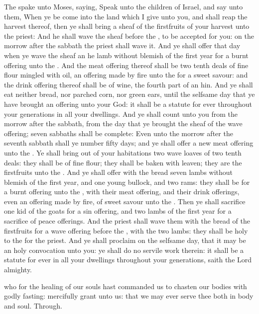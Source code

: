  The  spake unto Moses, saying, Speak unto the children of Israel, and say unto them, When ye be come into the land which I give unto you, and shall reap the harvest thereof, then ye shall bring a sheaf of the firstfruits of your harvest unto the priest: And he shall wave the sheaf before the , to be accepted for you: on the morrow after the sabbath the priest shall wave it. And ye shall offer that day when ye wave the sheaf an he lamb without blemish of the first year for a burnt offering unto the . And the meat offering thereof shall be two tenth deals of fine flour mingled with oil, an offering made by fire unto the  for a sweet savour: and the drink offering thereof shall be of wine, the fourth part of an hin. And ye shall eat neither bread, nor parched corn, nor green ears, until the selfsame day that ye have brought an offering unto your God: it shall be a statute for ever throughout your generations in all your dwellings. And ye shall count unto you from the morrow after the sabbath, from the day that ye brought the sheaf of the wave offering; seven sabbaths shall be complete: Even unto the morrow after the seventh sabbath shall ye number fifty days; and ye shall offer a new meat offering unto the . Ye shall bring out of your habitations two wave loaves of two tenth deals: they shall be of fine flour; they shall be baken with leaven; they are the firstfruits unto the . And ye shall offer with the bread seven lambs without blemish of the first year, and one young bullock, and two rams: they shall be for a burnt offering unto the , with their meat offering, and their drink offerings, even an offering made by fire, of sweet savour unto the . Then ye shall sacrifice one kid of the goats for a sin offering, and two lambs of the first year for a sacrifice of peace offerings. And the priest shall wave them with the bread of the firstfruits for a wave offering before the , with the two lambs: they shall be holy to the  for the priest. And ye shall proclaim on the selfsame day, that it may be an holy convocation unto you: ye shall do no servile work therein: it shall be a statute for ever in all your dwellings throughout your generations, saith the Lord almighty.


\collect
{}
{} who for the healing of our souls hast commanded us to chasten our bodies with godly fasting: mercifully grant unto us: that we may ever serve thee both in body and soul. Through.

